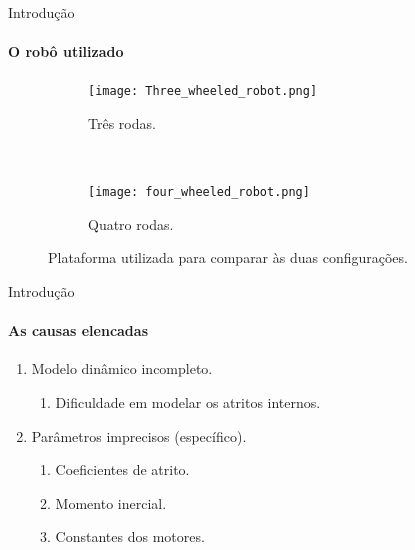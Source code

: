 \begin{frame}[t]{Introdução}
  \framesubtitle{O robô utilizado}
  \transdissolve[duration=0.5]

  \begin{figure}[ht!]
    \centering
    \begin{subfigure}[b]{0.3\textwidth}
      \texttt{[image: Three\_wheeled\_robot.png]}
      \caption{Três rodas.}
      \label{fig:3_wheels_robot}
    \end{subfigure}
    ~
    \begin{subfigure}[b]{0.3\textwidth}
      \texttt{[image: four\_wheeled\_robot.png]}
      \caption{Quatro rodas.}
      \label{fig:4_wheels_robot}
    \end{subfigure}
    
  \caption{Plataforma utilizada para comparar às duas configurações. \cite{Oliveira2008}}
  \end{figure}
  
\end{frame}

\begin{frame}[t]{Introdução}
  \framesubtitle{As causas elencadas}
  \transdissolve[duration=0.5]
  \begin{enumerate}
    \item Modelo dinâmico incompleto.
    \begin{enumerate}
      \item Dificuldade em modelar os atritos internos.
    \end{enumerate}

    \item Parâmetros imprecisos (específico).
    \begin{enumerate}
      \item Coeficientes de atrito.
      \item Momento inercial.
      \item Constantes dos motores.
    \end{enumerate}
  \end{enumerate}

\end{frame}

